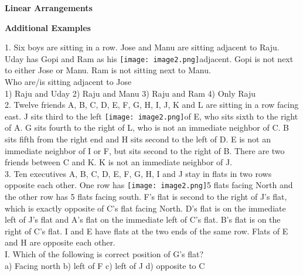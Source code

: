 \documentclass[
]{article}
\author{}
\date{}
\begin{document}
	
 

\begin{center}
	{\Large \textbf{Linear Arrangements \\}}
\end{center}

{\large \textbf{ Additional Examples \\}}

1. Six boys are sitting in a row. Jose and Manu are sitting adjacent to Raju. Uday has Gopi and
Ram as his \texttt{[image: image2.png]}adjacent. Gopi is not next to either Jose or Manu. Ram is not sitting next to
Manu.\\
Who are/is sitting adjacent to Jose\\
1) Raju and Uday \hspace{2mm}2) Raju and Manu
\hspace{2mm}3) Raju and Ram \hspace{2mm}4) Only Raju\\

2. Twelve friends A, B, C, D, E, F, G, H, I, J, K and L are sitting in a row facing east. J sits third
to the left \texttt{[image: image2.png]}of E, who sits sixth to the right of A. G sits fourth to the right of L, who is not an
immediate neighbor of C. B sits fifth from the right end and H sits second to the left of D. E
is not an immediate neighbor of I or F, but sits second to the right of B. There are two friends
between C and K. K is not an immediate neighbor of J.\\

3. Ten executives A, B, C, D, E, F, G, H, I and J stay in flats in two rows opposite each other.
One row has \texttt{[image: image2.png]}5 flats facing North and the other row has 5 flats facing south. F’s flat is second
to the right of J’s flat, which is exactly opposite of C’s flat facing North. D’s flat is on the
immediate left of J’s flat and A’s flat on the immediate left of C’s flat. B’s flat is on the right
of C’s flat. I and E have flats at the two ends of the same row. Flats of E and H are opposite
each other.\\

I. Which of the following is correct position of G’s flat?\\
a) Facing north \hspace{2mm}b) left of F \hspace{2mm}c) left of J \hspace{2mm}d) opposite to C\\
\end{document}
